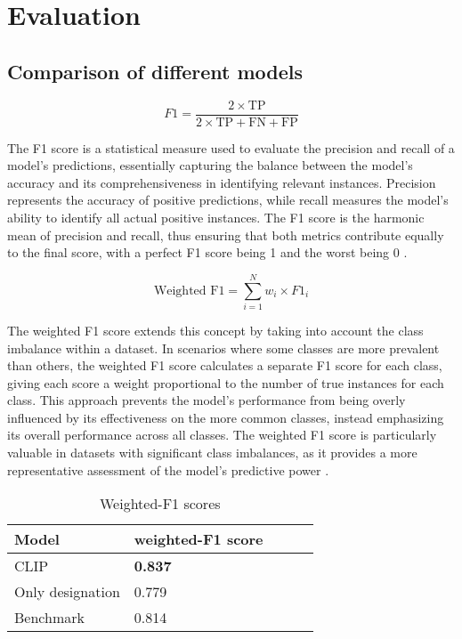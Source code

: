\chapter{Evaluation}
\label{sec:evaluation}
\section{Comparison of different models}

\begin{equation}
	F1 = \frac{2 \times \text{TP}}{2 \times \text{TP} + \text{FN} + \text{FP}}
\end{equation}

The F1 score is a statistical measure used to evaluate the precision and recall of a model's predictions, essentially capturing the balance between the model's accuracy and its comprehensiveness in identifying relevant instances. Precision represents the accuracy of positive predictions, while recall measures the model's ability to identify all actual positive instances. The F1 score is the harmonic mean of precision and recall, thus ensuring that both metrics contribute equally to the final score, with a perfect F1 score being 1 and the worst being 0 \cite{chicco-2020}.

\begin{equation}
	\text{Weighted F1} = \sum_{i=1}^{N} w_i \times F1_i
\end{equation}

The weighted F1 score extends this concept by taking into account the class imbalance within a dataset. In scenarios where some classes are more prevalent than others, the weighted F1 score calculates a separate F1 score for each class, giving each score a weight proportional to the number of true instances for each class. This approach prevents the model's performance from being overly influenced by its effectiveness on the more common classes, instead emphasizing its overall performance across all classes. The weighted F1 score is particularly valuable in datasets with significant class imbalances, as it provides a more representative assessment of the model's predictive power \cite{leung-2022}.

\begin{table}[h]
	\centering
	\begin{tabular}{|l|l|l|l|l|}
		\hline
		Model            & weighted-F1 score \\ \hline
		CLIP             & \textbf{0.837}    \\
		Only designation & 0.779             \\
		Benchmark        & 0.814             \\
		\hline
	\end{tabular}
	\caption{Weighted-F1 scores}
	\label{tab:f1scores}
\end{table}

